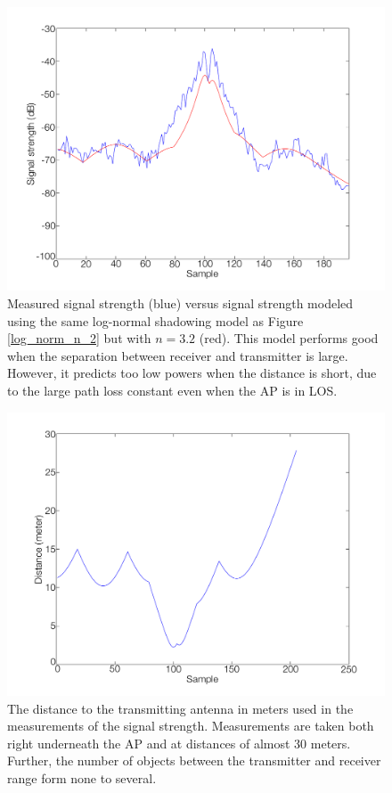 \documentclass{LTHthesis}
\begin{document}
\begin{figure}[!hbt]

\includegraphics[width=1\textwidth ]{images/signal_model/log_norm_n_3_2}
\caption{Measured signal strength (blue) versus signal strength modeled using the same log-normal shadowing model as Figure \ref{log_norm_n_2} but with $n=3.2$ (red). This model performs good when the separation between receiver and transmitter is large. However, it predicts too low powers when the distance is short, due to the large path loss constant even when the AP is in LOS. }\label{log_norm_n_3_2}
\end{figure}
%
\begin{figure}[!hbt]

\includegraphics[width=1\textwidth ]{images/signal_model/dist_trans}
\caption{The distance to the transmitting antenna in meters used in the measurements of the signal strength. Measurements are taken both right underneath the AP and at distances of almost 30 meters. Further, the number of objects between the transmitter and receiver range form none to several.}\label{dist_trans}
\end{figure}
\end{document}
